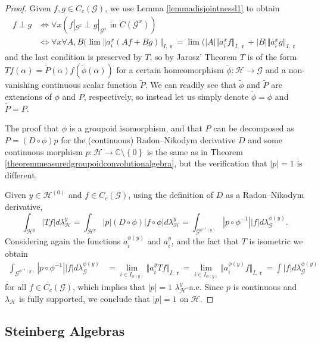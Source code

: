 \documentclass[letter,11pt]{amsart}
\theoremstyle{plain}		\newtheorem{theorem}[generalnumbering]{Theorem}
\theoremstyle{plain}		\newtheorem{corollary}[generalnumbering]{Corollary}
\theoremstyle{definition}		\newtheorem{definition}[generalnumbering]{Definition}
\theoremstyle{definition}		\newtheorem{example}[generalnumbering]{Example}
\theoremstyle{plain}		\newtheorem{proposition}[generalnumbering]{Proposition}
\theoremstyle{plain}		\newtheorem{lemma}[generalnumbering]{Lemma}
\theoremstyle{plain}    \newtheorem{plainstyle}[generalnumbering]{\namefordifferentenvironment}
\theoremstyle{plain}    \newtheorem*{plainstyle*}{\namefordifferentenvironment}
\theoremstyle{definition}    \newtheorem{definitionstyle}[generalnumbering]{\namefordifferentenvironment}
\theoremstyle{definition}    \newtheorem*{definitionstyle*}{\namefordifferentenvironment}
\DeclareMathOperator{\ra}{\mathfrak{r}}
\begin{document}
\begin{proof}
	Given $f,g\in C_c(\mathcal{G})$, we use Lemma \ref{lemmadisjointnessl1} to obtain
	\begin{align*}
	f\perp g&\iff\forall x\left(f|_{\mathcal{G}^x}\perp g|_{\mathcal{G}^x}\text{ in }C(\mathcal{G}^x)\right)\\
	&\iff\forall x\forall A,B(\lim\Vert a^x_i(Af+Bg)\Vert_{I,\ra}=\lim(|A|\Vert a^x_i f\Vert_{I,\ra}+|B|\Vert a^x_i g\Vert_{I,\ra}
	\end{align*}
	and the last condition is preserved by $T$, so by Jarosz' Theorem $T$ is of the form $Tf(\alpha)=\widetilde{P}(\alpha)f(\widetilde{\phi}(\alpha))$ for a certain homeomorphism $\widetilde{\phi}\colon\mathcal{H}\to\mathcal{G}$ and a non-vanishing continuous scalar function $\widetilde{P}$. We can readily see that $\widetilde{\phi}$ and $\widetilde{P}$ are extensions of $\phi$ and $P$, respectively, so instead let us simply denote $\widetilde{\phi}=\phi$ and $\widetilde{P}=P$.
	
	The proof that $\phi$ is a groupoid isomorphism, and that $P$ can be decomposed as $P=(D\circ\phi)p$ for the (continuous) Radon--Nikodym derivative $D$ and some continuous morphism $p\colon\mathcal{H}\to\mathbb{C}\setminus\left\{0\right\}$ is the same as in Theorem \ref{theoremmeasuredgroupoidconvolutionalgebra}, but the verification that $|p|=1$ is different.
	
	Given $y\in\mathcal{H}^{(0)}$  and $f\in C_c(\mathcal{G})$, using the definition of $D$ as a Radon--Nikodym derivative,
	\[\int_{\mathcal{H}^y}|Tf|d\lambda_{\mathcal{H}}^y=\int_{\mathcal{H}^y} |p|(D\circ\phi)|f\circ\phi|d\lambda_{\mathcal{H}}^y=\int_{\mathcal{G}^{\phi^{-1}(y)}} |p\circ\phi^{-1}||f|d\lambda_{\mathcal{G}}^{\phi(y)}.\]
	Considering again the functions $a^{\phi(y)}_i$ and $a^y_i$, and the fact that $T$ is isometric we obtain
	\begin{align*}
	\int_{\mathcal{G}^{\phi^{-1}(y)}} |p\circ\phi^{-1}||f|d\lambda_{\mathcal{G}}^{\phi(y)}&=\lim_{i\in I_{\phi(y)}}\Vert a_i^y Tf\Vert_{I,\ra}=\lim_{i\in I_{\phi(y)}}\Vert a_i^{\phi(y)} f\Vert_{I,\ra}= \int |f|d\lambda_{\mathcal{G}}^{\phi(y)}
	\end{align*}
	for all $f\in C_c(\mathcal{G})$, which implies that $|p|=1$ $\lambda_{\mathcal{H}}^y$-a.e. Since $p$ is continuous and $\lambda_{\mathcal{H}}$ is fully supported, we conclude that $|p|=1$ on $\mathcal{H}$.
\end{proof}

\subsection{Steinberg Algebras}
\end{document}
